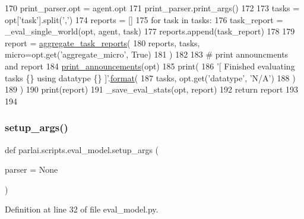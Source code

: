 \begin{DoxyCode}
170         print\_parser.opt = agent.opt
171         print\_parser.print\_args()
172 
173     tasks = opt[\textcolor{stringliteral}{'task'}].split(\textcolor{stringliteral}{','})
174     reports = []
175     \textcolor{keywordflow}{for} task \textcolor{keywordflow}{in} tasks:
176         task\_report = \_eval\_single\_world(opt, agent, task)
177         reports.append(task\_report)
178 
179     report = \hyperlink{namespaceparlai_1_1core_1_1metrics_ae323045c05ed03d93c260521ebb8bf71}{aggregate\_task\_reports}(
180         reports, tasks, micro=opt.get(\textcolor{stringliteral}{'aggregate\_micro'}, \textcolor{keyword}{True})
181     )
182 
183     \textcolor{comment}{# print announcments and report}
184     \hyperlink{namespaceparlai_1_1core_1_1params_afd1a47c94990168ea9e70d894a79bd2c}{print\_announcements}(opt)
185     print(
186         \textcolor{stringliteral}{'[ Finished evaluating tasks \{\} using datatype \{\} ]'}.\hyperlink{namespaceparlai_1_1chat__service_1_1services_1_1messenger_1_1shared__utils_a32e2e2022b824fbaf80c747160b52a76}{format}(
187             tasks, opt.get(\textcolor{stringliteral}{'datatype'}, \textcolor{stringliteral}{'N/A'})
188         )
189     )
190     print(report)
191     \_save\_eval\_stats(opt, report)
192     \textcolor{keywordflow}{return} report
193 
194 
\end{DoxyCode}
\mbox{\label{namespaceparlai_1_1scripts_1_1eval__model_a2eaba0aa76c4d83e2a0f7f77c23479c8}} 
\subsubsection{\texorpdfstring{setup\+\_\+args()}{setup\_args()}}
{\footnotesize\ttfamily def parlai.\+scripts.\+eval\+\_\+model.\+setup\+\_\+args (\begin{DoxyParamCaption}\item[{}]{parser = {\ttfamily None} }\end{DoxyParamCaption})}



Definition at line 32 of file eval\+\_\+model.\+py.


